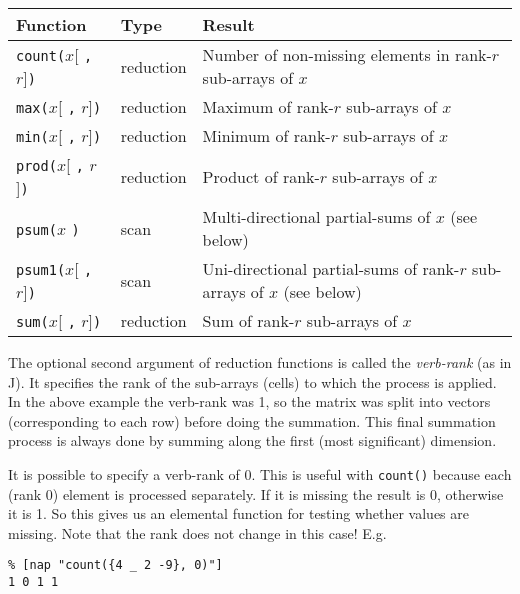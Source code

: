 \begin{tabular}{|l|l|l|}
    \hline 
      \textbf{Function} & \textbf{Type} & \textbf{Result}
    \\
      \hline 
      \hline 
        \texttt{count(}$x$[ \texttt{,} $r$]\texttt{)} & reduction & Number of non-missing elements in rank-$r$ sub-arrays of $x$
      \\
      \hline 
        \texttt{max(}$x$[ \texttt{,} $r$]\texttt{)} & reduction & Maximum of rank-$r$ sub-arrays of $x$
      \\
      \hline 
        \texttt{min(}$x$[ \texttt{,} $r$]\texttt{)} & reduction & Minimum of rank-$r$ sub-arrays of $x$
      \\
      \hline 
        \texttt{prod(}$x$[ \texttt{,} $r$]\texttt{)} & reduction & Product of rank-$r$ sub-arrays of $x$
      \\
      \hline 
        \texttt{psum(}$x$ \texttt{)} & scan & Multi-directional partial-sums of $x$ (see below)
      \\
      \hline 
        \texttt{psum1(}$x$[ \texttt{,} $r$]\texttt{)} & scan & Uni-directional partial-sums of rank-$r$ sub-arrays of $x$ (see below)
      \\
      \hline 
        \texttt{sum(}$x$[ \texttt{,} $r$]\texttt{)} & reduction & Sum of rank-$r$ sub-arrays of $x$
      \\
  \hline
\end{tabular}

  \par The optional second argument of reduction functions is called the 
  \textit{verb-rank} (as in J). It specifies the rank of the sub-arrays
  (cells) to which the process is applied. In the above example the
  verb-rank was 1, so the matrix was split into vectors (corresponding
  to each row) before doing the summation. This final summation process
  is always done by summing along the first (most significant)
  dimension.
  \par It is possible to specify a verb-rank of 0. This is useful with 
  \texttt{count()} because each (rank 0) element is processed
  separately. If it is missing the result is 0, otherwise it is 1. So
  this gives us an elemental function for testing whether values are
  missing. Note that the rank does not change in this case! E.g.
  \begin{verbatim}
% [nap "count({4 _ 2 -9}, 0)"]
1 0 1 1
\end{verbatim}

